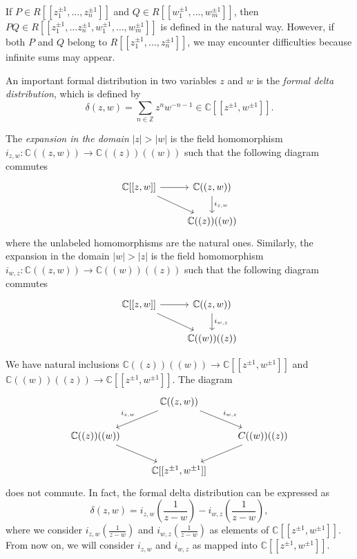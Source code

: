 \documentclass[a4paper, 12pt, reqno]{amsart}
\theoremstyle{remark}
\numberwithin{equation}{subsection}
\begin{document}
If $P \in R[[z_1^{\pm 1}, \dots, z_n^{\pm 1}]]$ and $Q \in R[[w_1^{\pm 1}, \dots, w_m^{\pm 1}]]$, then $PQ \in R[[z_1^{\pm 1}, \dots z_n^{\pm 1}, w_1^{\pm 1}, \dots, w_m^{\pm 1}]]$ is defined in the natural way.
However, if both $P$ and $Q$ belong to $R[[z_1^{\pm 1}, \dots, z_n^{\pm 1}]]$, we may encounter difficulties because infinite sums may appear.

An important formal distribution in two variables $z$ and $w$ is the \emph{formal delta distribution}, which is defined by
\begin{equation*}
  \delta(z, w) = \sum_{n \in \mathbb{Z}}z^nw^{-n - 1} \in \mathbb{C}[[z^{\pm 1}, w^{\pm 1}]].
\end{equation*}

The \emph{expansion in the domain} $|z| > |w|$ is the field homomorphism $i_{z, w}: \mathbb{C}((z, w)) \to \mathbb{C}((z))((w))$ such that the following diagram commutes
\begin{equation*}
  \begin{tikzcd}
    {\mathbb{C}[[z, w]]} \arrow[rd] \arrow[r] & {\mathbb{C}((z, w))} \arrow[d, "{i_{z, w}}"] \\
    & \mathbb{C}((z))((w))
  \end{tikzcd}
\end{equation*}
where the unlabeled homomorphisms are the natural ones.
Similarly, the expansion in the domain $|w| > |z|$ is the field homomorphism $i_{w, z}: \mathbb{C}((z, w)) \to \mathbb{C}((w))((z))$ such that the following diagram commutes
\begin{equation*}
  \begin{tikzcd}
    {\mathbb{C}[[z, w]]} \arrow[rd] \arrow[r] & {\mathbb{C}((z, w))} \arrow[d, "{i_{w, z}}"] \\
    & \mathbb{C}((w))((z))
  \end{tikzcd}
\end{equation*}

We have natural inclusions $\mathbb{C}((z))((w)) \to \mathbb{C}[[z^{\pm 1}, w^{\pm 1}]]$ and $\mathbb{C}((w))((z)) \to \mathbb{C}[[z^{\pm 1}, w^{\pm 1}]]$.
The diagram
\begin{equation*}
  \begin{tikzcd}
    & {\mathbb{C}((z, w))} \arrow[ld, "{i_{z, w}}"'] \arrow[rd, "{i_{w, z}}"] &\\
    \mathbb{C}((z))((w)) \arrow[rd] && {C}((w))((z)) \arrow[ld] \\
    & {\mathbb{C}[[z^{\pm 1}, w^{\pm 1}]]} &
  \end{tikzcd}
\end{equation*}
does not commute.
In fact, the formal delta distribution can be expressed as
\begin{equation*}
  \delta(z, w) = i_{z, w}\left(\frac{1}{z - w}\right) - i_{w, z}\left(\frac{1}{z - w}\right),
\end{equation*}
where we consider $i_{z, w}(\frac{1}{z - w})$ and $i_{w, z}(\frac{1}{z - w})$ as elements of $\mathbb{C}[[z^{\pm 1}, w^{\pm 1}]]$.
From now on, we will consider $i_{z, w}$ and $i_{w, z}$ as mapped into $\mathbb{C}[[z^{\pm 1}, w^{\pm 1}]]$.
\end{document}
